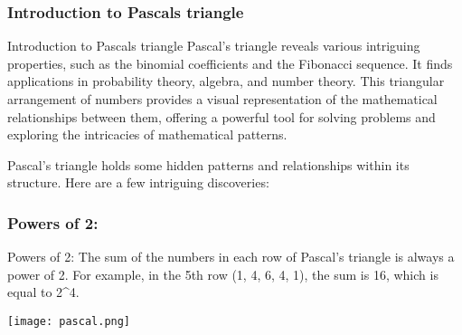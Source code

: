 \documentclass{beamer}
\begin{document}
\begin{frame}
    \frametitle{Introduction to Pascals triangle}
    \begin{block}{Introduction to Pascals triangle}
    Pascal's triangle reveals various intriguing properties, such as the binomial coefficients and the Fibonacci sequence. It finds applications in probability theory, algebra, and number theory. This triangular arrangement of numbers provides a visual representation of the mathematical relationships between them, offering a powerful tool for solving problems and exploring the intricacies of mathematical patterns.

Pascal's triangle holds some hidden patterns and relationships within its structure. Here are a few intriguing discoveries:
\end{block}
\end{frame}
\begin{frame}
\frametitle{Powers of 2: }
\begin{block}{Powers of 2: }
 The sum of the numbers in each row of Pascal's triangle is always a power of 2. For example, in the 5th row (1, 4, 6, 4, 1), the sum is 16, which is equal to 2^4.

\centering
\texttt{[image: pascal.png]}
\end{block}
\end{frame}
\end{document}
